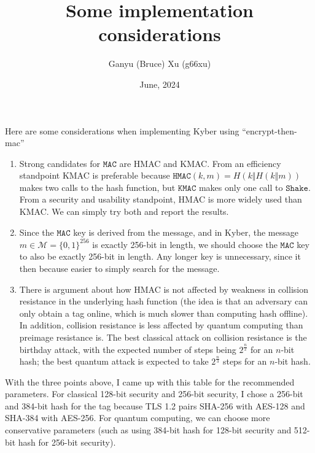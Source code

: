 \documentclass{article}
\title{Some implementation considerations}
\author{Ganyu (Bruce) Xu (g66xu)}
\date{June, 2024}
\newcommand{\monospace}{\texttt}
\newcommand{\mac}{\monospace{MAC}}
\begin{document}
\maketitle

Here are some considerations when implementing Kyber using ``encrypt-then-mac''

\begin{enumerate}
    \item Strong candidates for $\mac$ are HMAC and KMAC. From an efficiency standpoint KMAC is preferable because $\monospace{HMAC}(k, m) = H(k \Vert H(k \Vert m))$ makes two calls to the hash function, but $\monospace{KMAC}$ makes only one call to $\monospace{Shake}$. From a security and usability standpoint, HMAC is more widely used than KMAC. We can simply try both and report the results.
    
    \item Since the $\mac$ key is derived from the message, and in Kyber, the message $m \in \mathcal{M} = \{0,1\}^{256}$ is exactly 256-bit in length, we should choose the $\mac$ key to also be exactly 256-bit in length. Any longer key is unnecessary, since it then because easier to simply search for the message.
    
    \item There is argument about how HMAC is not affected by weakness in collision resistance in the underlying hash function\cite{krawczyk1997hmac} (the idea is that an adversary can only obtain a tag online, which is much slower than computing hash offline). In addition, collision resistance is less affected by quantum computing than preimage resistance is. The best classical attack on collision resistance is the birthday attack, with the expected number of steps being $2^{\frac{n}{2}}$ for an $n$-bit hash; the best quantum attack\cite{brassard1997quantum} is expected to take $2^{\frac{n}{3}}$ steps for an $n$-bit hash.
\end{enumerate}

With the three points above, I came up with this table for the recommended parameters. For classical 128-bit security and 256-bit security, I chose a 256-bit and 384-bit hash for the tag because TLS 1.2 pairs SHA-256 with AES-128 and SHA-384 with AES-256. For quantum computing, we can choose more conservative parameters (such as using 384-bit hash for 128-bit security and 512-bit hash for 256-bit security).
\end{document}
